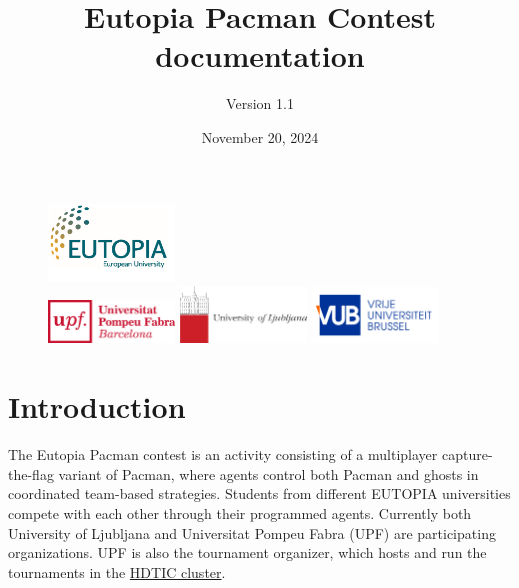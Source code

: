 \documentclass[11pt]{article}
\begin{document}
\title{Eutopia Pacman Contest documentation}
\author{\Large{Version 1.1}}
\date{November 20, 2024}
\maketitle


\begin{figure}[h!]
    \center 
    \includegraphics[width = 0.3\textwidth]{eutopia.png}\\
    \includegraphics[width = 0.3\textwidth]{UPFt_rgb.png}
    \includegraphics[width = 0.3\textwidth]{University-of-Ljubljana-logo.png} 
    \includegraphics[width = 0.3\textwidth]{Vrije_Universiteit_Brussel.png}
\end{figure}

\tableofcontents

\newpage
\section{Introduction}

The Eutopia Pacman contest is an activity consisting of a multiplayer capture-the-flag variant of Pacman, where agents control both Pacman and ghosts in coordinated team-based strategies. Students from different EUTOPIA universities compete with each other through their programmed agents.  Currently both University of Ljubljana and Universitat Pompeu Fabra (UPF) are participating organizations. 
UPF is also the tournament organizer, which hosts and run the tournaments in the \href{https://guiesbibtic.upf.edu/recerca/hpc}{HDTIC cluster}.
\end{document}
